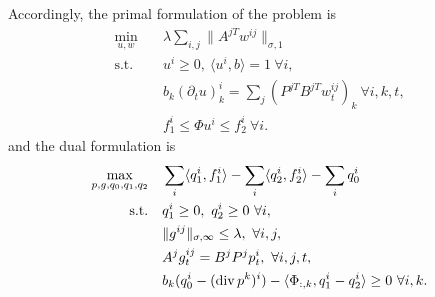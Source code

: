 Accordingly, the primal formulation of the problem is
\begin{align*}
    \min_{u, w} \quad
        & \lambda \sum_{i,j} \| A^{jT} w^{ij} \|_{\sigma,1} \\
    \text{s.t.}\quad 
        & u^i \geq 0, ~\langle u^i, b \rangle = 1 ~\forall i, \\
        & b_k (\partial_t u)_k^i = \sum_j (P^{jT}B^{jT}w^{ij}_t)_{k} ~\forall i,k,t, \\
        & f_1^i \leq \Phi u^i \leq f_2^i ~\forall i.
\end{align*}
and the dual formulation is
\begin{align*}
    \max_{p,g,q_0,q_1,q_2} \quad
        & \sum_{i} \langle q_1^i, f_1^i \rangle
        - \sum_{i} \langle q_2^i, f_2^i \rangle
        - \sum_i q_0^i \\
    \text{s.t.}\quad 
        & q_1^i \geq 0, ~q_2^i \geq 0 ~\forall i, \\
        & \|g^{ij}\|_{\sigma,\infty} \leq \lambda, ~\forall i,j, \\
        & A^j g^{ij}_t = B^j P^j p^i_t, ~\forall i,j,t, \\
        & b_k (q_0^i - (\operatorname{div} p^k)^i) - \langle \Phi_{:,k}, q_1^i - q_2^i \rangle \geq 0 ~\forall i, k.
\end{align*}


